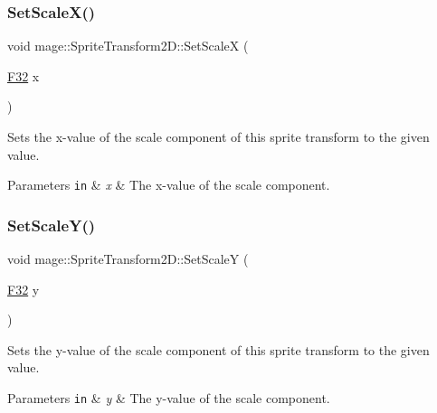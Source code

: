 \subsubsection{\texorpdfstring{Set\+Scale\+X()}{SetScaleX()}}
{\footnotesize\ttfamily void mage\+::\+Sprite\+Transform2\+D\+::\+Set\+ScaleX (\begin{DoxyParamCaption}\item[{\mbox{\hyperlink{namespacemage_aa97e833b45f06d60a0a9c4fc22ae02c0}{F32}}}]{x }\end{DoxyParamCaption})\hspace{0.3cm}{\ttfamily [noexcept]}}

Sets the x-\/value of the scale component of this sprite transform to the given value.


\begin{DoxyParams}[1]{Parameters}
\mbox{\tt in}  & {\em x} & The x-\/value of the scale component. \\
\hline
\end{DoxyParams}
\mbox{\label{classmage_1_1_sprite_transform2_d_a48344c5b112fda2219db2e54435c17ac}} 
\subsubsection{\texorpdfstring{Set\+Scale\+Y()}{SetScaleY()}}
{\footnotesize\ttfamily void mage\+::\+Sprite\+Transform2\+D\+::\+Set\+ScaleY (\begin{DoxyParamCaption}\item[{\mbox{\hyperlink{namespacemage_aa97e833b45f06d60a0a9c4fc22ae02c0}{F32}}}]{y }\end{DoxyParamCaption})\hspace{0.3cm}{\ttfamily [noexcept]}}

Sets the y-\/value of the scale component of this sprite transform to the given value.


\begin{DoxyParams}[1]{Parameters}
\mbox{\tt in}  & {\em y} & The y-\/value of the scale component. \\
\hline
\end{DoxyParams}
\mbox{\label{classmage_1_1_sprite_transform2_d_ae4f737a593b5adc42bd89b6049246a4e}} 
